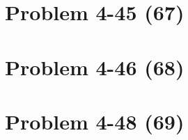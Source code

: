 \section*{Problem 4-45 (67)}
\label{sec:4-45}

\section*{Problem 4-46 (68)}
\label{sec:4-46}

\section*{Problem 4-48 (69)}
\label{sec:4-48}
